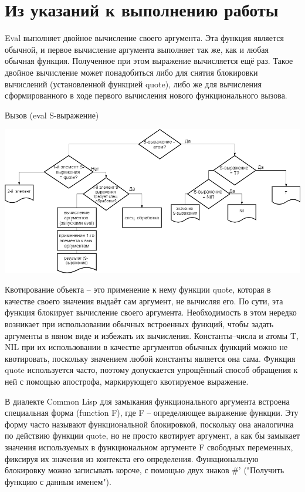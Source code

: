 \documentclass[12pt]{report}
\begin{document}
 

\section*{Из указаний  к выполнению работы}

Eval выполняет двойное  вычисление своего аргумента. Эта функция является обычной, и первое  вычисление аргумента выполняет так же, как и любая обычная функция.  Полученное при этом выражение вычисляется ещё раз. Такое двойное  вычисление может понадобиться либо для снятия блокировки вычислений (установленной функцией quote), либо же для вычисления сформированного в ходе первого вычисления нового функционального вызова.

Вызов (eval S-выражение)

\includegraphics[scale=0.5]{img/eval}



Квотирование объекта -- это применение к нему функции quote, которая в качестве своего значения выдаёт сам аргумент, не вычисляя его. По сути, эта функция блокирует вычисление своего аргумента. Необходимость в этом нередко возникает при использовании обычных встроенных функций, чтобы задать аргументы в явном виде и избежать их вычисления. Константы–числа и атомы T, NIL при их  использовании в качестве аргументов обычных функций можно не  квотировать, поскольку значением любой константы является она сама. Функция quote используется часто, поэтому допускается упрощённый способ обращения к ней с помощью апострофа, маркирующего квотируемое выражение.


В диалекте Common Lisp для замыкания функционального аргумента встроена специальная форма (function F), где F – определяющее  выражение функции. Эту форму часто называют функциональной  блокировкой, поскольку она аналогична по действию функции quote, но  не просто квотирует аргумент, а как бы замыкает значения используемых  в функциональном аргументе F свободных переменных, фиксируя их значения из контекста его определения. Функциональную блокировку  можно записывать короче, с помощью двух знаков \#' ("Получить функцию с данным именем").
\end{document}

